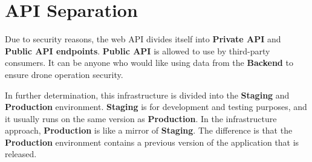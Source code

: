\section{API Separation}\label{sec:api-separation}
Due to security reasons, the web API divides itself into \textbf{Private API} and \textbf{Public API endpoints}.
\textbf{Public API} is allowed to use by third-party consumers.
It can be anyone who would like using data from the \textbf{Backend} to ensure drone operation security.

In further determination, this infrastructure is divided into the \textbf{Staging} and \textbf{Production} environment.
\textbf{Staging} is for development and testing purposes, and it usually runs on the same version as \textbf{Production}.
In the infrastructure approach, \textbf{Production} is like a mirror of \textbf{Staging}.
The difference is that the \textbf{Production} environment contains a previous version of the application that is released.






